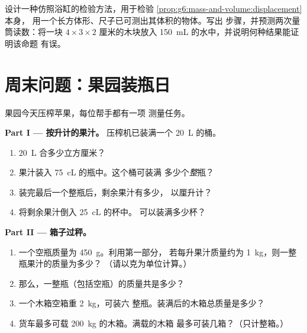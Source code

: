 \begin{exercise}[$\star\star\star$]\label{exo:g6:mass-and-volume:12}
设计一种仿照浴缸的检验方法，用于检验
\cref{prop:g6:mass-and-volume:displacement} 本身，
用一个长方体形、尺子已可测出其体积的物体。写出
步骤，并预测两次量筒读数：将一块
$4 \times 3 \times 2$ 厘米的木块放入
\qty{150}{mL} 的水中，并说明何种结果能证明该命题
有误。
\end{exercise}

\section{周末问题：果园装瓶日}

\begin{problem}\label{pb:g6:mass-and-volume:1}
果园今天压榨苹果，每位帮手都有一项
测量任务。

\medskip\noindent\textbf{Part I --- 按升计的果汁。}
压榨机已装满一个 \qty{20}{L} 的桶。
\begin{enumerate}
  \item \qty{20}{L} 合多少立方厘米？
  \item 果汁装入 \qty{75}{cL} 的瓶中。这个桶可装满
        多少个\emph{整}瓶？
  \item 装完最后一个整瓶后，剩余果汁有多少，
        以厘升计？
  \item 将剩余果汁倒入 \qty{25}{cL} 的杯中。
        可以装满多少杯？
\end{enumerate}

\medskip\noindent\textbf{Part II --- 箱子过秤。}
\begin{enumerate}[resume]
  \item 一个空瓶质量为 \qty{450}{g}。利用第一部分，
        若每升果汁质量约为 \qty{1}{kg}，则一整瓶果汁的质量为多少？
        （请以克为单位计算。）
  \item 那么，一整瓶（包括空瓶）的质量共是多少？
  \item 一个木箱空箱重 \qty{2}{kg}，可装六
        整瓶。装满后的木箱总质量是多少？
  \item 货车最多可载 \qty{200}{kg} 的木箱。满载的木箱
        最多可装几箱？（只计整箱。）
\end{enumerate}


\end{problem}
